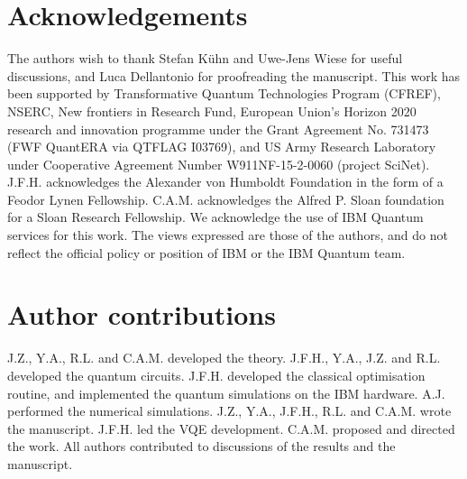 \documentclass[twocolumn,aps,showpacs,prb,superscriptaddress,floatfix,10pt,nofootinbib]{revtex4-2}
\begin{document}
\section*{Acknowledgements}
The authors wish to thank Stefan K\"uhn and Uwe-Jens Wiese for useful discussions, and Luca Dellantonio for proofreading the manuscript.
This work has been supported by Transformative Quantum Technologies Program (CFREF), NSERC, New frontiers in Research Fund, European Union's Horizon 2020 research and innovation programme under the Grant Agreement No. 731473 (FWF QuantERA via QTFLAG I03769), and US Army Research Laboratory under Cooperative Agreement Number W911NF-15-2-0060 (project SciNet).
J.F.H. acknowledges the Alexander von Humboldt Foundation in the form of a Feodor Lynen Fellowship. C.A.M. acknowledges the Alfred P. Sloan foundation for a Sloan Research Fellowship. 
We acknowledge the use of IBM Quantum services for this work. The views expressed are those of the authors, and do not reflect the official policy or position of IBM or the IBM Quantum team.



\section*{Author contributions}

J.Z., Y.A., R.L. and C.A.M. developed the theory. J.F.H., Y.A., J.Z. and R.L. developed the quantum circuits. J.F.H. developed the classical optimisation routine, and implemented the quantum simulations on the IBM hardware. A.J. performed the numerical simulations. J.Z., Y.A., J.F.H., R.L. and C.A.M. wrote the manuscript. J.F.H. led the VQE development. C.A.M. proposed and directed the work. All authors contributed to discussions of the results and the manuscript.
\end{document}
